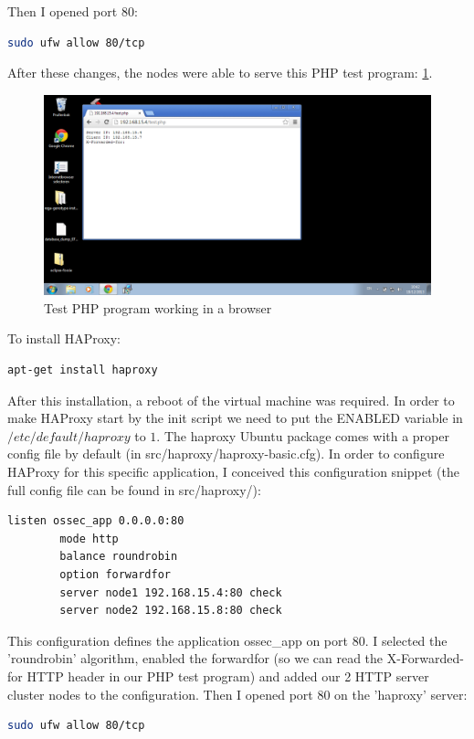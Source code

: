 \documentclass[12pt]{report}
\begin{document}
Then I opened port 80:
\begin{lstlisting}[language=bash]
  sudo ufw allow 80/tcp
\end{lstlisting} 

After these changes, the nodes were able to serve this PHP test
program: \cref{fig:test_php_working}.

\begin{figure}[h!]
  \caption{Test PHP program working in a browser}
  \label{fig:test_php_working}
  \centering
    \includegraphics[scale=0.3]{pics/test_php_working.png}
\end{figure}

To install HAProxy:
\begin{lstlisting}[language=bash]
apt-get install haproxy
\end{lstlisting} 
After this installation, a reboot of the virtual machine was required.
In order to make HAProxy start by the init script we need to put the
ENABLED variable in $/etc/default/haproxy$ to $1$.
The haproxy
Ubuntu package comes with a proper config file by default (in src/haproxy/haproxy-basic.cfg).   
In order to configure HAProxy for this specific application, I conceived
this configuration snippet (the full config file can be found in src/haproxy/):
\begin{lstlisting}[language=bash]
listen ossec_app 0.0.0.0:80
        mode http
        balance roundrobin
        option forwardfor
        server node1 192.168.15.4:80 check
        server node2 192.168.15.8:80 check
\end{lstlisting} 
This configuration defines the application ossec\_app on port 80.
I selected the 'roundrobin' algorithm, enabled the forwardfor (so we can read
the X-Forwarded-for HTTP header in our PHP test program) and added our 2
HTTP server cluster nodes to the configuration.
Then I opened port 80 on the 'haproxy' server:
\begin{lstlisting}[language=bash]
  sudo ufw allow 80/tcp
\end{lstlisting} 
\end{document}

